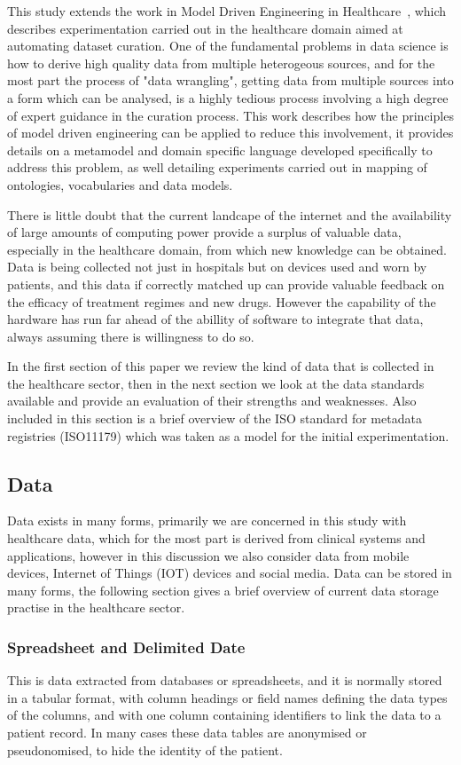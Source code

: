\documentclass[runningheads]{llncs}
\begin{document}
	This study extends the work in Model Driven Engineering in Healthcare~\cite{modelsward19}, which describes experimentation carried out in the healthcare domain aimed at automating dataset curation. One of the fundamental problems in data science is how to derive high quality data from multiple heterogeous sources, and for the most part the process of "data wrangling", getting data from multiple sources into a form which can be analysed, is a highly tedious process involving a high degree of expert guidance in the curation process. This work describes how the principles of model driven engineering can be applied to reduce this involvement, it provides details on a metamodel and domain specific language developed specifically to address this problem, as well detailing experiments carried out in mapping of ontologies, vocabularies and data models.
	
	 There is little doubt that the current landcape of the internet and the availability of large amounts of computing power provide a surplus of valuable data, especially in the healthcare domain, from which new knowledge can be obtained. Data is being collected not just in hospitals but on devices used and worn by patients, and this data if correctly matched up can provide valuable feedback on the efficacy of treatment regimes and new drugs. However the capability of the hardware has run far ahead of the abillity of software to integrate that data, always assuming there is willingness to do so. 
	 
	 In the first section of this paper we review the kind of data that is collected in the healthcare sector, then in the next section we look at the data standards available and provide an evaluation of their strengths and weaknesses. Also included in this section is a brief overview of the ISO standard for metadata registries (ISO11179) which was taken as a model for the initial experimentation.
	
	\subsection{Data}
	Data exists in many forms, primarily we are concerned in this study with healthcare data, which for the most part is derived from clinical systems and applications, however in this discussion we also consider data from mobile devices, Internet of Things (IOT) devices and social media. Data can be stored in many forms, the following section gives a brief overview of current data storage practise in the healthcare sector.
	\subsubsection{Spreadsheet and Delimited Date}
	This is data extracted from databases or spreadsheets, and it is normally stored in a tabular format, with column headings or field names defining the data types of the columns, and with one column containing identifiers to link the data to a patient record. In many cases these data tables are anonymised or pseudonomised, to hide the identity of the patient.
\end{document}
